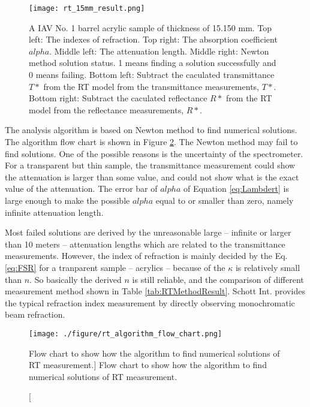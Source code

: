 \begin{figure}[p]
    \centering
    \texttt{[image: rt\_15mm\_result.png]}
    \caption[Result of RT method of 15 mm acrylic sample]
{A IAV No. 1 barrel acrylic sample of thickness of 15.150 mm.
Top left: The indexes of refraction.
Top right: The absorption coefficient $alpha$.
Middle left: The attenuation length.
Middle right: Newton method solution status. 1 means finding a solution successfully and 0 means failing.
Bottom left: Subtract the caculated transmittance $T*$ from the RT model from the transmittance measurements, $T*$.
Bottom right: Subtract the caculated reflectance $R*$ from the RT model from the reflectance measurements, $R*$.
}
    \label{fig:rt_15mm_result.png}
    \end{figure}

The analysis algorithm is based on Newton method to find numerical solutions.
The algorithm flow chart is shown in Figure \ref{fig:rt_algorithm_flow_chart.png}.
The Newton method  may fail to find solutions. One of the possible reasons is the uncertainty of the spectrometer.
For a transparent but thin sample, the transmittance measurement could show the attenuation
is larger than some value, and could not show what is the exact value of the attenuation.
The error bar of ${alpha}$ of Equation \ref{eq:Lambdert} is large enough to make
the possible ${alpha}$ equal to or smaller than zero, namely infinite attenuation length.

Most failed solutions are derived by the unreasonable large -- infinite or larger than 10 meters --
attenuation lengths which are related to the transmittance measurements.
However, the index of refraction is mainly decided by the Eq. \ref{eq:FSR} for a tranparent sample -- acrylics -- because
of the $\kappa$ is relatively small than $n$. So basically the derived $n$ is still reliable, and the comparison
of different measurement method shown in Table \ref{tab:RTMethodResult}.
Schott Int. provides the typical refraction index measurement by directly observing monochromatic beam refraction.




\begin{figure}
    \centering
    \texttt{[image: ./figure/rt\_algorithm\_flow\_chart.png]}
    \caption
    [Flow chart to show how the algorithm to find numerical solutions of RT measurement.]
    {Flow chart to show how the algorithm to find numerical solutions of RT measurement.}
    \label{fig:rt_algorithm_flow_chart.png}
    \end{figure}


